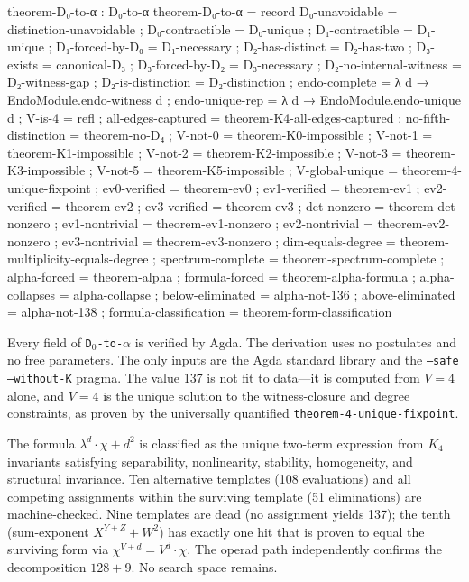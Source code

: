 \documentclass[11pt,a4paper]{article}
\begin{document}
\begin{code}
theorem-D₀-to-α : D₀-to-α
theorem-D₀-to-α = record
  { D₀-unavoidable        = distinction-unavoidable
  ; D₀-contractible       = D₀-unique
  ; D₁-contractible       = D₁-unique
  ; D₁-forced-by-D₀      = D₁-necessary
  ; D₂-has-distinct       = D₂-has-two
  ; D₃-exists             = canonical-D₃
  ; D₃-forced-by-D₂       = D₃-necessary
  ; D₂-no-internal-witness = D₂-witness-gap
  ; D₂-is-distinction     = D₂-distinction
  ; endo-complete          = λ d → EndoModule.endo-witness d
  ; endo-unique-rep        = λ d → EndoModule.endo-unique d
  ; V-is-4                = refl
  ; all-edges-captured     = theorem-K4-all-edges-captured
  ; no-fifth-distinction   = theorem-no-D₄
  ; V-not-0               = theorem-K0-impossible
  ; V-not-1               = theorem-K1-impossible
  ; V-not-2               = theorem-K2-impossible
  ; V-not-3               = theorem-K3-impossible
  ; V-not-5               = theorem-K5-impossible
  ; V-global-unique       = theorem-4-unique-fixpoint
  ; ev0-verified          = theorem-ev0
  ; ev1-verified          = theorem-ev1
  ; ev2-verified          = theorem-ev2
  ; ev3-verified          = theorem-ev3
  ; det-nonzero           = theorem-det-nonzero
  ; ev1-nontrivial        = theorem-ev1-nonzero
  ; ev2-nontrivial        = theorem-ev2-nonzero
  ; ev3-nontrivial        = theorem-ev3-nonzero
  ; dim-equals-degree     = theorem-multiplicity-equals-degree
  ; spectrum-complete     = theorem-spectrum-complete
  ; alpha-forced          = theorem-alpha
  ; formula-forced        = theorem-alpha-formula
  ; alpha-collapses       = alpha-collapse
  ; below-eliminated      = alpha-not-136
  ; above-eliminated      = alpha-not-138
  ; formula-classification = theorem-form-classification
  }
\end{code}

\bigskip
\noindent Every field of \texttt{D$_0$-to-$\alpha$} is verified by Agda.
The derivation uses no postulates and no free parameters.
The only inputs are the Agda standard library and the
\texttt{--safe --without-K} pragma.
The value 137 is not fit to data---it is computed from $V = 4$ alone,
and $V = 4$ is the unique solution to the witness-closure and degree
constraints, as proven by the universally quantified
\texttt{theorem-4-unique-fixpoint}.

The formula $\lambda^d \cdot \chi + d^2$ is classified as the unique
two-term expression from $K_4$ invariants satisfying separability,
nonlinearity, stability, homogeneity, and structural invariance.
Ten alternative templates (108 evaluations) and all competing
assignments within the surviving template (51 eliminations) are
machine-checked. Nine templates are dead (no assignment yields 137);
the tenth (sum-exponent $X^{Y+Z}+W^2$) has exactly one hit that is
proven to equal the surviving form via $\chi^{V+d} = V^d \cdot \chi$.
The operad path independently confirms the decomposition $128 + 9$.
No search space remains.
\end{document}
